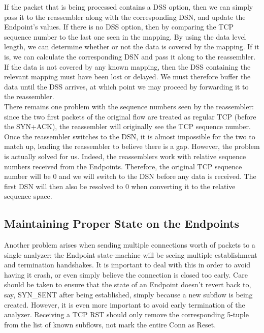 If the packet that is being processed contains a DSS option, then we can simply pass it to the reassembler along with the corresponding DSN, and update the Endpoint's values. If there is no DSS option, then by comparing the TCP sequence number to the last one seen in the mapping. By using the data level length, we can determine whether or not the data is covered by the mapping. If it is, we can calculate the corresponding DSN and pass it along to the reassembler. If the data is not covered by any known mapping, then the DSS containing the relevant mapping must have been lost or delayed. We must therefore buffer the data until the DSS arrives, at which point we may proceed by forwarding it to the reassembler.\\

There remains one problem with the sequence numbers seen by the reassembler: since the two first packets of the original flow are treated as regular TCP (before the SYN+ACK), the reassembler will originally see the TCP sequence number. Once the reassembler switches to the DSN, it is almost impossible for the two to match up, leading the reassembler to believe there is a gap. However, the problem is actually solved for us. Indeed, the reassemblers work with relative sequence numbers received from the Endpoints. Therefore, the original TCP sequence number will be 0 and we will switch to the DSN before any data is received. The first DSN will then also be resolved to 0 when converting it to the relative sequence space.

\subsection{Maintaining Proper State on the Endpoints}

Another problem arises when sending multiple connections worth of packets to a single analyzer: the Endpoint state-machine will be seeing multiple establishment and termination handshakes. It is important to deal with this in order to avoid having it crash, or even simply believe the connection is closed too early. Care should be taken to ensure that the state of an Endpoint doesn't revert back to, say, SYN\_SENT after being established, simply because a new subflow is being created. However, it is even more important to avoid early termination of the analyzer. Receiving a TCP RST should only remove the corresponding 5-tuple from the list of known subflows,  not mark the entire Conn as Reset. \\



